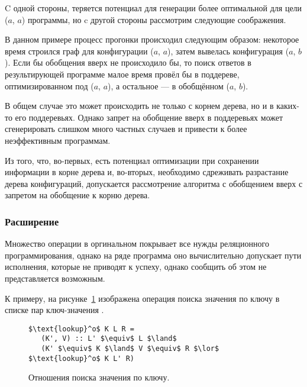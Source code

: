 C одной стороны, теряется потенциал для генерации более оптимальной для цели ($a$, $a$)
программы, но c другой стороны рассмотрим следующие соображения.

В данном примере процесс прогонки происходил следующим образом: некоторое время строился
граф для конфигурации ($a$, $a$), затем вывелась конфигурация ($a$, $b$).
Если бы обобщения вверх не происходило бы, то поиск ответов в результирующей программе
малое время провёл бы в поддереве, оптимизированном под ($a$, $a$), а остальное --- в обобщённом
($a$, $b$).

В общем случае это может происходить не только с корнем дерева, но и в каких-то его поддеревьях.
Однако запрет на обобщение вверх в поддеревьях может сгенерировать слишком много частных случаев
и привести к более неэффективным программам.

Из того, что, во-первых, есть потенциал оптимизации при сохранении информации в корне дерева и,
во-вторых, необходимо сдреживать разрастание дерева конфигураций,
допускается рассмотрение алгоритма с обобщением вверх с запретом на обобщение к корню дерева.


\subsubsection{Расширение \ukanren}

Множество операции в оргинальном \ukanren покрывает все нужды реляционного программирования,
однако на ряде программа оно вычислительно допускает пути исполнения, которые не приводят
к успеху, однако сообщить об этом не представляется возможным.

К примеру, на рисунке~\ref{fig:lookup} изображена операция поиска значения по ключу
в списке пар ключ-значения .

\begin{figure}[h!]
\begin{lstlisting}
$\text{lookup}^o$ K L R =
   (K', V) :: L' $\equiv$ L $\land$
   (K' $\equiv$ K $\land$ V $\equiv$ R $\lor$ $\text{lookup}^o$ K L' R)
\end{lstlisting}
\caption{Отношения поиска значения по ключу.}
\label{fig:lookup}
\end{figure}

